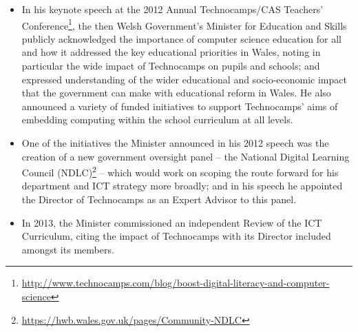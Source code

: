 \documentclass{sig-alternate}
\begin{document}
\begin{itemize}

\item
In his keynote speech at the 2012 Annual Technocamps/CAS Teachers'
Conference\footnote{\url{http://www.technocamps.com/blog/boost-digital-literacy-and-computer-science}},
the then Welsh Government's Minister for Education and Skills publicly
acknowledged the importance of computer science education for all and
how it addressed the key educational priorities in Wales, noting in particular
the wide impact of Technocamps on pupils and schools; and expressed 
understanding of the wider educational and socio-economic impact that
the government can make with educational reform in Wales. He also
announced a variety of funded initiatives to support Technocamps' aims
of embedding computing within the school curriculum at all levels.

%
%
%

\item
One of the initiatives the Minister announced in his 2012 speech was
the creation of a new government oversight panel -- the National
Digital Learning Council
(NDLC)\footnote{\url{https://hwb.wales.gov.uk/pages/Community-NDLC}}
-- which would work on scoping the route forward for his department
and ICT strategy more broadly;
and in his speech he appointed
the Director of Technocamps as an Expert Advisor
to this panel.

\item
In 2013, the Minister commissioned an independent Review of the ICT
Curriculum, citing the impact of Technocamps with its Director
included amongst its members.


\end{itemize}
\end{document}
